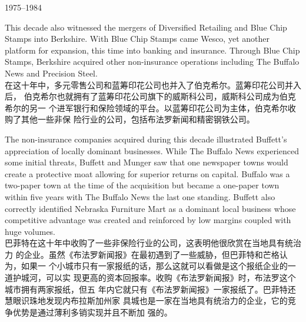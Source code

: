 \begin{section}{1975--1984}
\begin{verseparallel}
  {
    This decade also witnessed the mergers of Diversified Retailing and Blue
    Chip Stamps into Berkshire. With Blue Chip Stamps came Wesco, yet another
    platform for expansion, this time into banking and insurance. Through Blue
    Chip Stamps, Berkshire acquired other non-insurance operations including The
    Buffalo News and Precision Steel. \\
  }
  {
    在这十年中，多元零售公司和蓝筹印花公司也并入了伯克希尔。蓝筹印花公司并入后，
    伯克希尔也就拥有了蓝筹印花公司旗下的威斯科公司，威斯科公司成为伯克希尔的另一
    个进军银行和保险领域的平台。以蓝筹印花公司为主体，伯克希尔收购了其他一些非保
    险行业的公司，包括布法罗新闻和精密钢铁公司。
  }
\end{verseparallel}

\begin{verseparallel}
  {
    The non-insurance companies acquired during this decade illustrated
    Buffett's appreciation of locally dominant businesses. While The Buffalo
    News experienced some initial threats, Buffett and Munger saw that one
    newspaper towns would create a protective moat allowing for superior returns
    on capital. Buffalo was a two-paper town at the time of the acquisition but
    became a one-paper town within five years with The Buffalo News the last one
    standing. Buffett also correctly identified Nebraska Furniture Mart as a
    dominant local business whose competitive advantage was created and
    reinforced by low margins coupled with huge volumes. \\
  }
  {
    巴菲特在这十年中收购了一些非保险行业的公司，这表明他很欣赏在当地具有统治力
    的企业。虽然《布法罗新闻报》在最初遇到了一些威胁，但巴菲特和芒格认为，如果一
    个小城市只有一家报纸的话，那么这就可以看做是这个报纸企业的一道护城河，可以实
    现更高的资本回报率。收购《布法罗新闻报》时，布法罗这个城市拥有两家报纸，但五
    年内它就只有《布法罗新闻报》一家报纸了。巴菲特还慧眼识珠地发现内布拉斯加州家
    具城也是一家在当地具有统治力的企业，它的竞争优势是通过薄利多销实现并且不断加
    强的。
  }
\end{verseparallel}


\end{section}
